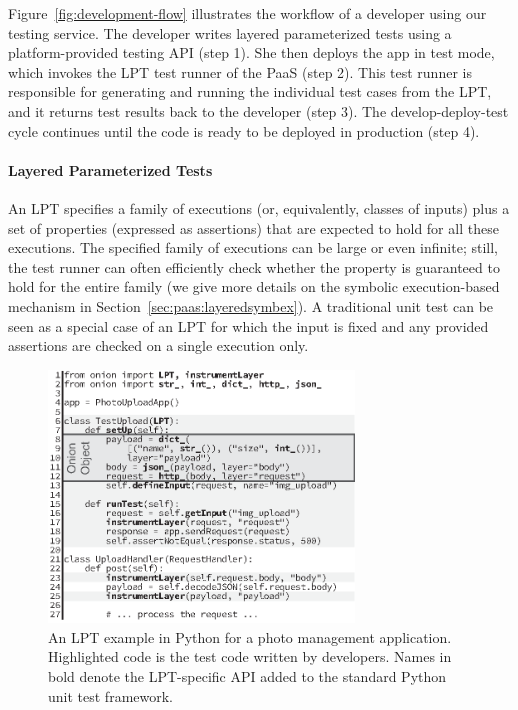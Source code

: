 Figure~\ref{fig:development-flow} illustrates the workflow of a developer using our testing service.
%
The developer writes layered parameterized tests using a platform-provided testing API (step 1). She then deploys the app in test mode, which invokes the LPT test runner of the PaaS (step 2). This test runner is responsible for generating and running the individual test cases from the LPT, and it returns test results back to the developer (step 3). The develop-deploy-test cycle continues until the code is ready to be deployed in production (step 4).


\paragraph{Layered Parameterized Tests}

An LPT specifies a family of executions (or, equivalently, classes of inputs) plus a set of properties (expressed as assertions) that are expected to hold for all these executions.
%
The specified family of executions can be large or even infinite; still, the test runner can often efficiently check whether the property is guaranteed to hold for the entire family (we give more details on the symbolic execution-based mechanism in Section~\ref{sec:paas:layeredsymbex}).  A traditional unit test can be seen as a special case of an LPT for which the input is fixed and any provided assertions are checked on a single execution only.

\begin{figure}
  \centering
  \includegraphics[width=3.2in]{paas/figures/overlay}
  \caption{An LPT example in Python for a photo management application.  Highlighted code is the test code written by developers.  Names in bold denote the LPT-specific API added to the standard Python unit test framework.}
  \label{fig:test-lpt}
\end{figure}

